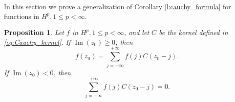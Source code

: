 \documentclass[12pt,a4paper,reqno]{amsart}
\newtheorem{prop}[thm]{Proposition}
\theoremstyle{definition}
\theoremstyle{definition}\newtheorem{defn}[thm]{Definition}
\begin{document}
    In this section we prove a generalization of Corollary \ref{l:cauchy_formula} for functions in $H^p, 1\leqslant p<\infty$. 
    \begin{prop}\label{p:cauchy_half_plane}
    Let $f$ in $H^p, 1\leqslant p <\infty$, and let $C$ be the kernel defined in \eqref{eq:Cauchy_kernel}. If $\operatorname{Im}(z_0)\geqslant 0$, then
    \begin{equation}\label{eq:cauchy_half_plane}
     f(z_0)=\sum_{j=-\infty}^{+\infty}f(j)C(z_0-j) .  
    \end{equation}
    If $\operatorname{Im}(z_0)<0$, then
    \begin{equation*} 
    \sum_{j=-\infty}^{+\infty}f(j)C(z_0-j)=0.   
    \end{equation*}
    \end{prop}
        
\end{document}
